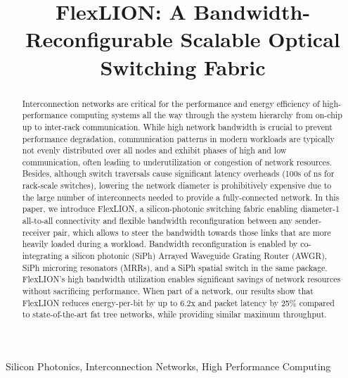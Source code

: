 \documentclass[journal]{IEEEtran}
\begin{document}
\title{FlexLION: A Bandwidth-Reconfigurable Scalable Optical Switching Fabric}



\maketitle

\begin{abstract}
Interconnection networks are critical for the performance and energy efficiency of high-performance computing systems all the way through the system hierarchy from on-chip up to inter-rack communication. While high network bandwidth is crucial to prevent performance degradation, communication patterns in modern workloads are typically not evenly distributed over all nodes and exhibit phases of high and low communication, often leading to underutilization or congestion of network resources. Besides, although switch traversals cause significant latency overheads (100s of ns for rack-scale switches), lowering the network diameter is prohibitively expensive due to the large number of interconnects needed to provide a fully-connected network. In this paper, we introduce FlexLION, a silicon-photonic switching fabric enabling diameter-1 all-to-all connectivity and flexible bandwidth reconfiguration between any sender-receiver pair, which allows to steer the bandwidth towards those links that are more heavily loaded during a workload. Bandwidth reconfiguration is enabled by co-integrating a silicon photonic (SiPh) Arrayed Waveguide Grating Router (AWGR), SiPh microring resonators (MRRs), and a SiPh spatial switch in the same package. FlexLION's high bandwidth utilization enables significant savings of network resources without sacrificing performance. When part of a  network, our results show that FlexLION reduces energy-per-bit by up to 6.2x and packet latency by 25\% compared to state-of-the-art fat tree networks, while providing similar maximum throughput. 
\end{abstract}

\begin{IEEEkeywords}
Silicon Photonics, Interconnection Networks, High Performance Computing
\end{IEEEkeywords}






\end{document}
